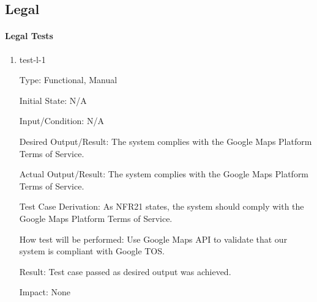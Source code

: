 \documentclass[12pt, titlepage]{article}
\begin{document}
\subsection{Legal}

\paragraph{Legal Tests}

\begin{enumerate}

\item{test-l-1\\}

Type: Functional, Manual

Initial State: N/A	

Input/Condition: N/A		

Desired Output/Result:  The system complies with the Google Maps Platform Terms of Service.

Actual Output/Result: The system complies with the Google Maps Platform Terms of Service.

Test Case Derivation: As NFR21 states, the system should comply with the Google Maps Platform Terms of Service.

How test will be performed: Use Google Maps API to validate that our system is compliant with Google TOS. 

Result: Test case passed as desired output was achieved.

Impact: None

\end{enumerate}

\newpage
\end{document}
